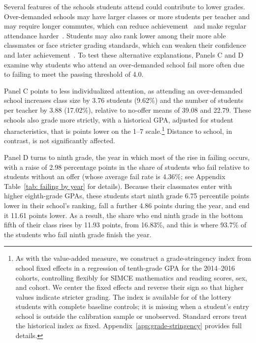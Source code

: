 Several features of the schools students attend could contribute to lower grades. Over-demanded schools may have larger classes or more students per teacher and may require longer commutes, which can reduce achievement~\citep{Krueger1999,AngristLavy1999} and make regular attendance harder~\citep{CordesRickSchwartz2022}. Students may also rank lower among their more able classmates or face stricter grading standards, which can weaken their confidence and later achievement~\citep{MurphyWeinhardt2020,betts_2003}. To test these alternative explanations, Panels C and D examine why students who attend an over-demanded school fail more often due to failing to meet the passing threshold of 4.0.

Panel C points to less individualized attention, as attending an over-demanded school increases class size by 3.76 students (9.62\%) and the number of students per teacher by 3.88 (17.02\%), relative to no-offer means of 39.08 and 22.79. These schools also grade more strictly, with a historical GPA, adjusted for student characteristics, that is \GSEffect{} points lower on the 1--7 scale.\footnote{As with the value-added measure, we construct a grade-stringency index from school fixed effects in a regression of tenth-grade GPA for the 2014--2016 cohorts, controlling flexibly for SIMCE mathematics and reading scores, sex, and cohort. We center the fixed effects and reverse their sign so that higher values indicate stricter grading. The index is available for \GSObservedN{} of the \GSLotteryN{} lottery students with complete baseline controls; it is missing when a student's entry school is outside the calibration sample or unobserved. Standard errors treat the historical index as fixed. Appendix~\ref{app:grade-stringency} provides full details.} Distance to school, in contrast, is not significantly affected.

Panel D turns to ninth grade, the year in which most of the rise in failing occurs, with a raise of 2.98 percentage points in the share of students who fail relative to students without an offer (whose average fail rate is 4.36\%; see Appendix Table~\ref{tab: failing by year} for details). Because their classmates enter with higher eighth-grade GPAs, these students start ninth grade 6.75 percentile points lower in their school's ranking, fall a further 4.86 points during the year, and end it 11.61 points lower. As a result, the share who end ninth grade in the bottom fifth of their class rises by 11.93 points, from 16.83\%, and this is where 93.7\% of the students who fail ninth grade finish the year.  

